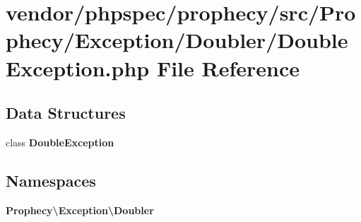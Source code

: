 \section{vendor/phpspec/prophecy/src/\+Prophecy/\+Exception/\+Doubler/\+Double\+Exception.php File Reference}
\label{_double_exception_8php}
\subsection*{Data Structures}
\begin{DoxyCompactItemize}
\item 
class {\bf Double\+Exception}
\end{DoxyCompactItemize}
\subsection*{Namespaces}
\begin{DoxyCompactItemize}
\item 
 {\bf Prophecy\textbackslash{}\+Exception\textbackslash{}\+Doubler}
\end{DoxyCompactItemize}
